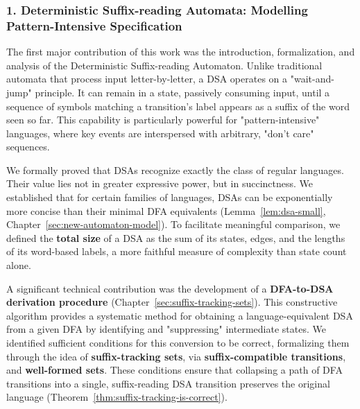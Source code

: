 \subsubsection*{1. Deterministic Suffix-reading Automata: Modelling Pattern-Intensive Specification}

The first major contribution of this work was the introduction, formalization, and analysis of the Deterministic Suffix-reading Automaton. Unlike traditional automata that process input letter-by-letter, a DSA operates on a "wait-and-jump" principle. It can remain in a state, passively consuming input, until a sequence of symbols matching a transition’s label appears as a suffix of the word seen so far. This capability is particularly powerful for "pattern-intensive" languages, where key events are interspersed with arbitrary, "don't care" sequences.

We formally proved that DSAs recognize exactly the class of regular languages. %
Their value lies not in greater expressive power, but in succinctness. We established that for certain families of languages, DSAs can be exponentially more concise than their minimal DFA equivalents (Lemma~\ref{lem:dsa-small}, Chapter~\ref{sec:new-automaton-model}). To facilitate meaningful comparison, we defined the \textbf{total size} of a DSA as the sum of its states, edges, and the lengths of its word-based labels, a more faithful measure of complexity than state count alone.

A significant technical contribution was the development of a \textbf{DFA-to-DSA derivation procedure} (Chapter~\ref{sec:suffix-tracking-sets}). This constructive algorithm provides a systematic method for obtaining a language-equivalent DSA from a given DFA by identifying and "suppressing" intermediate states. We identified sufficient conditions for this conversion to be correct, formalizing them through the idea of \textbf{suffix-tracking sets}, via \textbf{suffix-compatible transitions}, and \textbf{well-formed sets}. These conditions ensure that collapsing a path of DFA transitions into a single, suffix-reading DSA transition preserves the original language (Theorem~\ref{thm:suffix-tracking-is-correct}).

